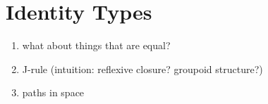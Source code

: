 \section{Identity Types}
\begin{enumerate}
  \item what about things that are equal?
  \item J-rule (intuition: reflexive closure? groupoid structure?)
  \item paths in space
\end{enumerate}